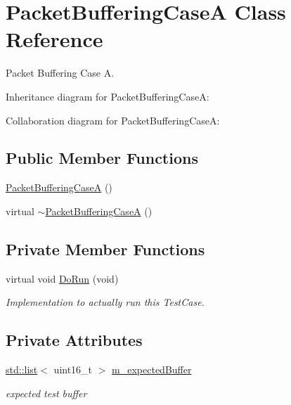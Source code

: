 \hypertarget{classPacketBufferingCaseA}{}\section{Packet\+Buffering\+CaseA Class Reference}
\label{classPacketBufferingCaseA}


Packet Buffering Case A.  




Inheritance diagram for Packet\+Buffering\+CaseA\+:


Collaboration diagram for Packet\+Buffering\+CaseA\+:
\subsection*{Public Member Functions}
\begin{DoxyCompactItemize}
\item 
\hyperlink{classPacketBufferingCaseA_a303549bd2ed8bf868e365d4206dc5307}{Packet\+Buffering\+CaseA} ()
\item 
virtual \hyperlink{classPacketBufferingCaseA_a7e925944179812b1f60d4208794b9395}{$\sim$\+Packet\+Buffering\+CaseA} ()
\end{DoxyCompactItemize}
\subsection*{Private Member Functions}
\begin{DoxyCompactItemize}
\item 
virtual void \hyperlink{classPacketBufferingCaseA_aff39506eb86a3791a76939497b5ad785}{Do\+Run} (void)
\begin{DoxyCompactList}\small\item\em Implementation to actually run this Test\+Case. \end{DoxyCompactList}\end{DoxyCompactItemize}
\subsection*{Private Attributes}
\begin{DoxyCompactItemize}
\item 
\hyperlink{openflow-interface_8h_afd9bcfa176617760671b67580f536fa7}{std\+::list}$<$ uint16\+\_\+t $>$ \hyperlink{classPacketBufferingCaseA_a9984383a1d31e0e704c530dfdd28e2d6}{m\+\_\+expected\+Buffer}
\begin{DoxyCompactList}\small\item\em expected test buffer \end{DoxyCompactList}\end{DoxyCompactItemize}
